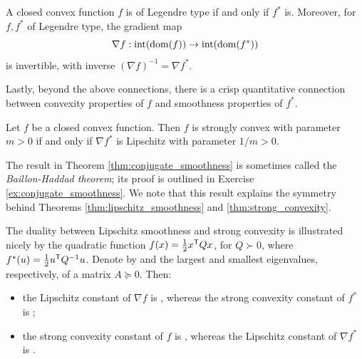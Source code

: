 \begin{Theorem}
\label{thm:conjugate_legendre}
A closed convex function $f$ is of Legendre type if and only if $f^*$
is. Moreover, for $f,f^*$ of Legendre type, the gradient map
\[
\nabla f : \operatorname{int}(\operatorname{dom}(f)) \to \operatorname{int}(\operatorname{dom}(f^*))
\]
is invertible, with inverse $(\nabla f)^{-1} = \nabla f^*$. 
\end{Theorem}


Lastly, beyond the above connections, there is a crisp quantitative connection
between convexity properties of $f$ and smoothness properties of $f^*$. 

\begin{Theorem}
\label{thm:conjugate_smoothness}
Let $f$ be a closed convex function. Then $f$ is strongly convex with parameter
$m>0$ if and only if $\nabla f^*$ is Lipschitz with parameter $1/m>0$. 
\end{Theorem}

The result in Theorem \ref{thm:conjugate_smoothness} is sometimes called the
\emph{Baillon-Haddad theorem}; its proof is outlined in Exercise
\ref{ex:conjugate_smoothness}. We note that this result explains the symmetry 
behind Theorems \ref{thm:lipschitz_smoothness} and \ref{thm:strong_convexity}.

\medskip

\begin{Example}
The duality between Lipschitz smoothness and strong convexity is illustrated
nicely by the quadratic function $f(x) = \frac{1}{2} x^{\mathsf{T}} Q x$, for $Q \succ
0$, where $f^*(u) = \frac{1}{2} u^{\mathsf{T}} Q^{-1}u$. Denote by
 and  the largest and
smallest eigenvalues, respectively, of a matrix $A \succeq 0$. Then:
\begin{itemize}
\item the Lipschitz constant of $\nabla f$ is ,
  whereas the strong convexity constant of $f^*$ is
  ;
\item the strong convexity constant of $f$ is ,
  whereas the Lipschitz constant of $\nabla f^*$ is
  . 
\end{itemize}
\end{Example}

